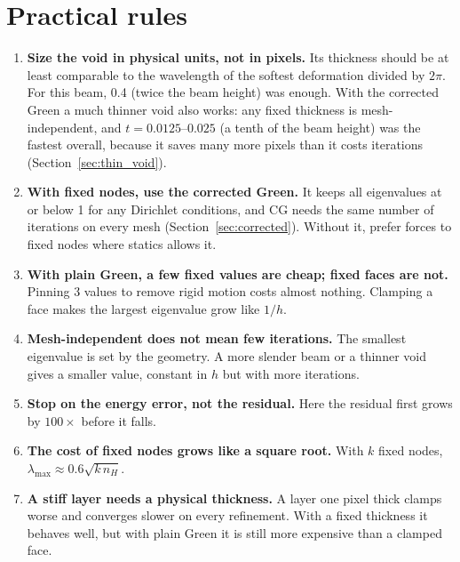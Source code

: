 \documentclass[11pt,a4paper]{article}
\begin{document}
\section{Practical rules}
\begin{enumerate}
  \item \textbf{Size the void in physical units, not in pixels.} Its thickness should be at least comparable to the
        wavelength of the softest deformation divided by $2\pi$. For this beam, 0.4 (twice the beam height) was enough.
        With the corrected Green a much thinner void also works: any fixed thickness is mesh-independent, and
        $t = 0.0125$--$0.025$ (a tenth of the beam height) was the fastest overall, because it saves many more pixels
        than it costs iterations (Section~\ref{sec:thin_void}).
  \item \textbf{With fixed nodes, use the corrected Green.} It keeps all eigenvalues at or below 1 for any Dirichlet
        conditions, and CG needs the same number of iterations on every mesh (Section~\ref{sec:corrected}). Without it,
        prefer forces to fixed nodes where statics allows it.
  \item \textbf{With plain Green, a few fixed values are cheap; fixed faces are not.} Pinning 3 values to remove rigid
        motion costs almost nothing. Clamping a face makes the largest eigenvalue grow like $1/h$.
  \item \textbf{Mesh-independent does not mean few iterations.} The smallest eigenvalue is set by the geometry. A more
        slender beam or a thinner void gives a smaller value, constant in $h$ but with more iterations.
  \item \textbf{Stop on the energy error, not the residual.} Here the residual first grows by $100\times$ before it
        falls.
  \item \textbf{The cost of fixed nodes grows like a square root.} With $k$ fixed nodes, $\lambda_{\max} \approx
        0.6\sqrt{k\,n_H}$.
  \item \textbf{A stiff layer needs a physical thickness.} A layer one pixel thick clamps worse and converges slower on
        every refinement. With a fixed thickness it behaves well, but with plain Green it is still more expensive than a
        clamped face.
\end{enumerate}
\end{document}
